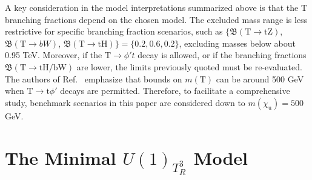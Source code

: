 A key consideration in the model interpretations summarized above is that the $\mathrm{T}$ branching fractions depend on the chosen model. The excluded mass range is less restrictive for specific branching fraction scenarios, such as $\{\mathfrak{B}(\mathrm{T} \to \textrm{tZ})$, $\mathfrak{B}(\mathrm{T} \to bW)$, $\mathfrak{B}(\mathrm{T} \to \textrm{tH})\}= \{0.2, 0.6, 0.2\}$, excluding masses below about 0.95 \textrm{TeV}. Moreover, if the $\mathrm{T} \to \phi't $ decay is allowed, or if the branching fractions $\mathfrak{B}(\mathrm{T} \to \textrm{tH/bW})$ are lower, the limits previously quoted must be re-evaluated. The authors of Ref.~\parencite{Cacciapaglia:2019zmj} emphasize that bounds on $m(\mathrm{T})$ can be around 500 \textrm{GeV} when $\mathrm{T} \to \mathrm{t}\phi'$ decays are permitted. Therefore, to facilitate a comprehensive study, benchmark scenarios in this paper are considered down to $m(\chi_\mathrm{u}) = 500$ \textrm{GeV}.

\section{\boldmath The Minimal $U(1)_{T_R^3}$ Model}\label{sec:model}
